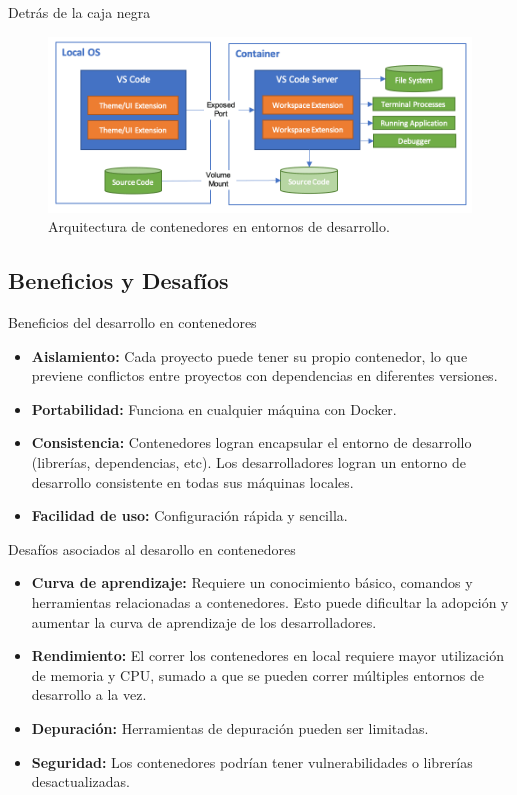 \documentclass{beamer}
\begin{document}
\begin{frame}{Detrás de la caja negra}
  \begin{figure}
    \centering
    \includegraphics[width=\textwidth]{images/architecture-containers.png}
    \caption{Arquitectura de contenedores en entornos de desarrollo.}
  \end{figure}
\end{frame}

\subsection{Beneficios y Desafíos}
\begin{frame}{Beneficios del desarrollo en contenedores}
  \begin{itemize}
    \item \textbf{Aislamiento:} Cada proyecto puede tener su propio contenedor, lo que previene conflictos entre proyectos con dependencias en diferentes versiones.
    \item \textbf{Portabilidad:} Funciona en cualquier máquina con Docker.
    \item \textbf{Consistencia:} Contenedores logran encapsular el entorno de desarrollo (librerías, dependencias, etc). Los desarrolladores logran un entorno de desarrollo consistente en todas sus máquinas locales.
    \item \textbf{Facilidad de uso:} Configuración rápida y sencilla.
  \end{itemize}
\end{frame}

\begin{frame}{Desafíos asociados al desarollo en contenedores}
  \begin{itemize}
    \item \textbf{Curva de aprendizaje:} Requiere un conocimiento básico, comandos y herramientas relacionadas a contenedores. Esto puede dificultar la adopción y aumentar la curva de aprendizaje de los desarrolladores.
    \item \textbf{Rendimiento:} El correr los contenedores en local requiere mayor utilización de memoria y CPU, sumado a que se pueden correr múltiples entornos de desarrollo a la vez.
    \item \textbf{Depuración:} Herramientas de depuración pueden ser limitadas.
    \item \textbf{Seguridad:} Los contenedores podrían tener vulnerabilidades o librerías desactualizadas.
  \end{itemize}
\end{frame}
\end{document}
